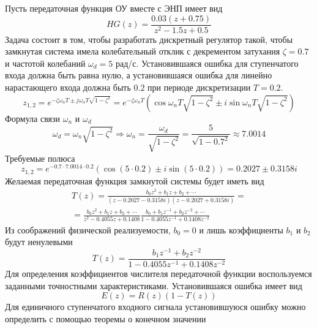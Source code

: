 Пусть передаточная функция ОУ вместе с ЭНП имеет вид
\begin{equation}
	HG(z) = \frac{0.03(z+0.75)}{z^2 - 1.5 z + 0.5}
\end{equation}
Задача состоит в том, чтобы разработать дискретный регулятор такой, чтобы замкнутая система имела колебательный отклик с декрементом затухания $\zeta = 0.7$ и частотой колебаний $\omega_d = 5$ рад/с. Установившаяся ошибка для ступенчатого входа должна быть равна нулю, а установившаяся ошибка для линейно нарастающего входа должна быть $0.2$ при периоде дискретизации $T = 0.2$.
\begin{equation}
	z_{1,2} = e^{-\zeta \omega_n T \pm j \omega_n T \sqrt{1 - \zeta^2}} = e^{-\zeta \omega_n T} \left(\cos \omega_n T \sqrt{1 - \zeta^2} \pm i\sin \omega_n T \sqrt{1 - \zeta^2} \right)
\end{equation}
Формула связи $\omega_n$ и $\omega_d$
\begin{equation}
	\omega_d = \omega_n \sqrt{1 - \zeta^2} \Rightarrow
	\omega_n = \frac{\omega_d}{\sqrt{1 - \zeta^2}} = \frac{5}{\sqrt{1 - 0.7^2}} \approx 7.0014
\end{equation}
Требуемые полюса
\begin{equation}
	z_{1,2} = e^{-0.7 \cdot 7.0014 \cdot 0.2} \left(\cos (5 \cdot 0.2) \pm i \sin (5 \cdot 0.2) \right) = 0.2027 \pm 0.3158 i
\end{equation}
Желаемая передаточная функция замкнутой системы будет иметь вид
\begin{multline}
	T(z) = \frac{b_0z^2 + b_1 z + b_2  + \cdots}{\left(z -0.2027 - 0.3158 i \right)\left(z -0.2027 + 0.3158 i \right)} = \\
	= \frac{b_0z^2 + b_1 z + b_2  + \cdots}{z^2 - 0.4055 z + 0.1408} \frac{b_0 + b_1 z^{-1} + b_2 z^{-2} + \cdots}{1 - 0.4055 z^{-1} + 0.1408 z^{-2}}
\end{multline}
Из соображений физической реализуемости, $b_0 = 0$ и лишь коэффициенты $b_1$ и $b_2$ будут ненулевыми
\begin{equation}
	T(z) = \frac{b_1z^{-1} + b_2 z^{-2}}{1 - 0.4055 z^{-1} + 0.1408 z^{-2}}
\end{equation}
Для определения коэффициентов числителя передаточной функции воспользуемся заданными точностными характеристиками. Установившаяся ошибка имеет вид
\begin{equation}
	E(z) = R(z) \left(1 - T(z)\right)
\end{equation}
Для единичного ступенчатого входного сигнала установившуюся ошибку можно определить с помощью теоремы о конечном значении
